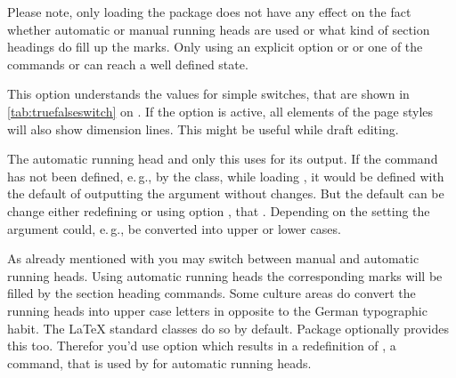   Please note, only loading the package does not have any
  effect on the fact whether automatic or manual running heads are used or
  what kind of section headings do fill up the marks. Only using an explicit
  option  or  or one of the commands
   or  can reach a well defined state.%
  \EndIndexGroup


  \begin{Declaration}
  \end{Declaration}
  This \KOMAScript{} option understands the values for simple switches, that
  are shown in \autoref{tab:truefalseswitch} on
  . If the option is active, all elements of
  the page styles will also show dimension lines. This might be useful while
  draft editing.%
  \EndIndexGroup

  \begin{Declaration}
  \end{Declaration}
  The automatic running head and only this uses  for its
  output. If the command has not been defined, e.\,g., by the class, while
  loading , it would be defined with the default of
  outputting the argument  without changes. But the default can
  be change either redefining  or using option
  , that %
  .
  Depending on the setting the argument could, e.\,g., be converted into
  upper or lower cases.
  \EndIndexGroup


  \begin{Declaration}
  \end{Declaration}
  As already mentioned with  you may switch between manual
  and automatic running heads. Using automatic running heads the corresponding
  marks will be filled by the section heading commands. Some culture areas do
  convert the running heads into upper case letters in opposite to the German
  typographic habit. The \LaTeX{} standard classes do so by default. Package
   optionally provides this too. Therefor you'd use option
   which results in a redefinition of
  , a
  command, that is used by  for automatic running heads.

